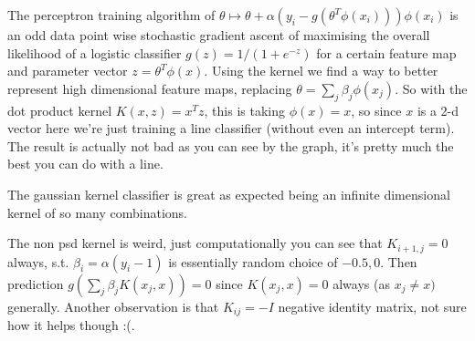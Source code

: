 \begin{answer}
The perceptron training algorithm of $\theta \mapsto \theta + \alpha(y_i - g(\theta^T \phi(x_i)))\phi(x_i)$ is an odd data point wise stochastic gradient ascent of maximising the overall likelihood of a logistic classifier $g(z)= 1/(1 + e^{-z})$ for a certain feature map and parameter vector $z = \theta^T \phi(x)$. Using the kernel we find a way to better represent high dimensional feature maps, replacing $\theta = \sum_j \beta_j \phi(x_j)$. So with the dot product kernel $K(x,z) = x^Tz$, this is taking $\phi(x)=x$, so since $x$ is a 2-d vector here we're just training a line classifier (without even an intercept term). The result is actually not bad as you can see by the graph, it's pretty much the best you can do with a line.

The gaussian kernel classifier is great as expected being an infinite dimensional kernel of so many combinations.

The non psd kernel is weird, just computationally you can see that $K_{i+1,j} = 0$ always, s.t. $\beta_i = \alpha(y_i - 1)$ is essentially random choice of $-0.5,0$. Then prediction $g(\sum_j \beta_j K(x_j, x))=0$ since $K(x_j, x)=0$ always (as $x_j \neq x)$ generally. Another observation is that $K_{ij} = -I$ negative identity matrix, not sure how it helps though :(.
\end{answer}

